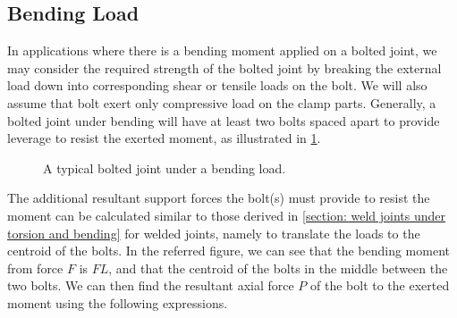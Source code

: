 \documentclass[
10pt,
a4paper,
openany,
svgnames,
]{book}
\begin{document}
\subsection{Bending Load}

In applications where there is a bending moment applied on a bolted joint, we may consider the required strength of the bolted joint by breaking the external load down into corresponding shear or tensile loads on the bolt. We will also assume that bolt exert only compressive load on the clamp parts. Generally, a bolted joint under bending will have at least two bolts spaced apart to provide leverage to resist the exerted moment, as illustrated in \cref{fig: bolted joint under bending}.

\begin{figure}[h]
  \centering
  \caption{A typical bolted joint under a bending load.}
  \label{fig: bolted joint under bending}
\end{figure}

The additional resultant support forces the bolt(s) must provide to resist the moment can be calculated similar to those derived in \cref{section: weld joints under torsion and bending} for welded joints, namely to translate the loads to the centroid of the bolts. In the referred figure, we can see that the bending moment from force $F$ is $FL$, and that the centroid of the bolts in the middle between the two bolts. We can then find the resultant axial force $P$ of the bolt to the exerted moment using the following expressions.
\end{document}
